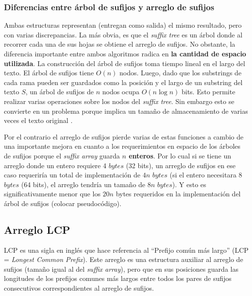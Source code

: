 \subsubsection*{Diferencias entre árbol de sufijos y arreglo de sufijos}

Ambas estructuras representan (entregan como salida) el mismo resultado, pero con varias discrepancias. La más obvia, es que el \textit{suffix tree} es un árbol donde al recorrer cada una de sus hojas se obtiene el arreglo de sufijos. No obstante, la diferencia importante entre ambos algoritmos radica en \textbf{la cantidad de espacio utilizada}. La construcción del árbol de sufijos toma tiempo lineal en el largo del texto. El árbol de sufijos tiene $O(n)$ nodos. Luego, dado que los substrings de cada rama pueden ser guardados como la posición y el largo de un substring del texto $S$, un árbol de sufijos de $n$ nodos ocupa $O(n \log n)$ bits. Esto permite realizar varias operaciones sobre los nodos del \textit{suffix tree}. Sin embargo esto se convierte en un problema porque implica un tamaño de almacenamiento de varias veces el texto original \cite{abeliuk}. 

Por el contrario el arreglo de sufijos pierde varias de estas funciones a cambio de una importante mejora en cuanto a los requerimientos en espacio de los árboles de sufijos porque el \textit{suffix array} guarda \textbf{$n$ enteros}. Por lo cual si se tiene un arreglo donde un entero requiere 4 $bytes$ (32 bits), un arreglo de sufijos en ese caso requeriría un total de implementación de $4n$ $bytes$ (si el entero necesitara 8 $bytes$ (64 bits), el arreglo tendría un tamaño de $8n$ $bytes$). Y esto es significativamente menor que los $20n$ bytes requeridos en la implementación del árbol de sufijos \cite{kurtz} (colocar pseudocódigo).

\subsection{Arreglo LCP}

LCP es una sigla en inglés que hace referencia al ``Prefijo común más largo'' (LCP = \textit{Longest Common Prefix}). Este arreglo es una estructura auxiliar al arreglo de sufijos (tamaño igual al del \textit{suffix array}), pero que en sus posiciones guarda las longitudes de los prefijos comunes más largos entre todos los pares de sufijos consecutivos correspondientes al arreglo de sufijos. 

